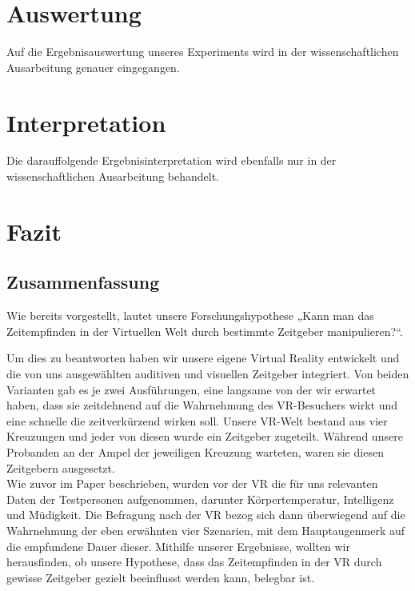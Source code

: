 \documentclass{Bericht}
\begin{document}
\section{Auswertung}
	Auf die Ergebnisauswertung unseres Experiments wird in der wissenschaftlichen Ausarbeitung genauer eingegangen.

\section{Interpretation}
	Die darauffolgende Ergebnisinterpretation  wird ebenfalls nur in der wissenschaftlichen Ausarbeitung behandelt.
	
\section{Fazit}

\subsection{Zusammenfassung}
Wie bereits vorgestellt, lautet unsere Forschungshypothese „Kann man das Zeitempfinden in der Virtuellen Welt durch bestimmte Zeitgeber manipulieren?“.
\par
Um dies zu beantworten haben wir unsere eigene Virtual Reality entwickelt und die von uns ausgewählten auditiven und visuellen Zeitgeber integriert. Von beiden Varianten gab es je zwei Ausführungen, eine langsame von der wir erwartet haben, dass sie zeitdehnend auf die Wahrnehmung des VR-Besuchers wirkt und eine schnelle die zeitverkürzend wirken soll. Unsere VR-Welt bestand aus vier Kreuzungen und jeder von diesen wurde ein Zeitgeber zugeteilt. Während unsere Probanden an der Ampel der jeweiligen Kreuzung warteten, waren sie diesen Zeitgebern ausgesetzt. 
\\
Wie zuvor im Paper beschrieben, wurden vor der VR  die für uns relevanten Daten der Testpersonen aufgenommen, darunter Körpertemperatur, Intelligenz und Müdigkeit. Die Befragung nach der VR bezog sich dann überwiegend auf die Wahrnehmung der eben erwähnten vier Szenarien, mit dem Hauptaugenmerk auf die empfundene Dauer dieser. Mithilfe unserer Ergebnisse, wollten wir herausfinden, ob unsere Hypothese, dass das Zeitempfinden in der VR durch gewisse Zeitgeber gezielt beeinflusst werden kann, belegbar ist.
\end{document}
